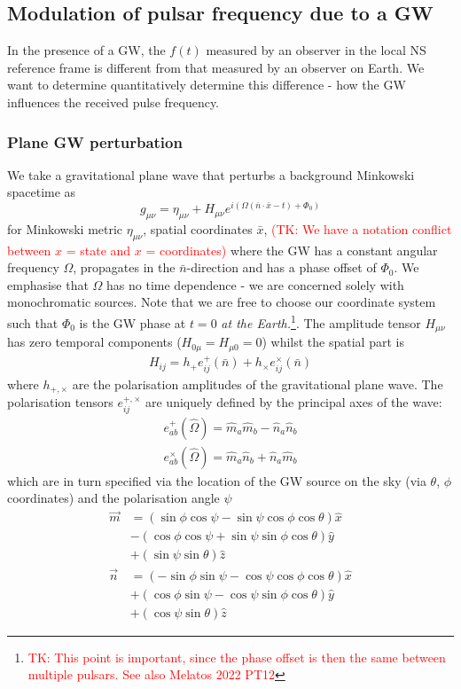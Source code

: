 \documentclass[fleqn,usenatbib,useAMS]{mnras}
\begin{document}
\subsection{Modulation of pulsar frequency due to a GW}
In the presence of a GW, the $f(t)$  measured by an observer in the local NS reference frame is different from that measured by an observer on Earth. We want to determine quantitatively determine this difference - how the GW influences the received pulse frequency.

\subsubsection{Plane GW perturbation}
We take a gravitational plane wave that perturbs a background Minkowski spacetime as
\begin{equation}
	g_{\mu \nu} = \eta_{\mu \nu} + H_{\mu \nu} e^{i(\Omega(\bar{n} \cdot \bar{x} - t) + \Phi_0)	}
\end{equation}
for Minkowski metric $ \eta_{\mu \nu}$, spatial coordinates $\bar{x}$, \textcolor{red}{(TK: We have a notation conflict between $x$ = state and $x$ = coordinates)} where the GW has a constant angular frequency $\Omega$, propagates in the $\bar{n}$-direction and has a phase offset of  $\Phi_0$. We emphasise that $\Omega$ has no time dependence - we are concerned solely with monochromatic sources. Note that we are free to choose our coordinate system such that $\Phi_0$ is the GW phase at $t=0$ \textit{at the Earth.}\footnote{\textcolor{red}{TK: This point is important, since the phase offset is then the same between multiple pulsars. See also Melatos 2022 PT12}}. The amplitude tensor $H_{\mu \nu}$ has zero temporal components ($H_{0 \mu} = H_{\mu 0} = 0$) whilst the spatial part is
\begin{align}
	H_{ij} = h_+ e_{ij}^+(\bar{n}) + h_{\times} e_{ij}^{\times}(\bar{n})
\end{align}
where  $h_{+,\times}$ are the polarisation amplitudes of the gravitational plane wave. The polarisation tensors $e_{ij}^{+,\times}$ are uniquely defined by the principal axes of the wave:
\begin{align}
	e_{a b}^{+}(\hat{\Omega}) =\hat{m}_a \hat{m}_b-\hat{n}_a \hat{n}_b \\
		e_{a b}^{\times}(\hat{\Omega}) =\hat{m}_a \hat{n}_b+\hat{n}_a \hat{m}_b
\end{align}
which are in turn specified via the location of the GW source on the sky (via $\theta$, $\phi$ coordinates) and the polarisation angle $\psi$
\begin{align}
	\vec{m} & =(\sin \phi \cos \psi-\sin \psi \cos \phi \cos \theta) \hat{x} \nonumber \\
	& -(\cos \phi \cos \psi+\sin \psi \sin \phi \cos \theta) \hat{y} \nonumber \\
	& +(\sin \psi \sin \theta) \hat{z} \\
	\vec{n} & =(-\sin \phi \sin \psi-\cos \psi \cos \phi \cos \theta) \hat{x} \nonumber \\
	& +(\cos \phi \sin \psi-\cos \psi \sin \phi \cos \theta) \hat{y}\nonumber  \\
	& +(\cos \psi \sin \theta) \hat{z}
\end{align}
\end{document}
